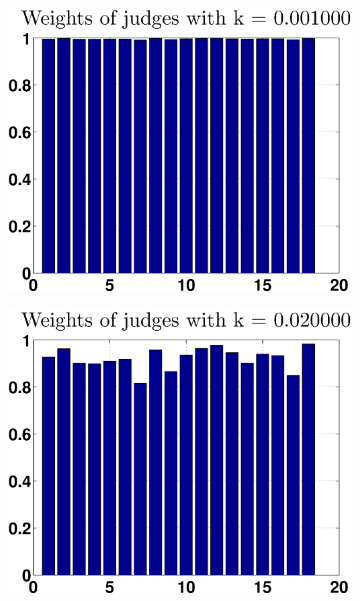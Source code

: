 \documentclass[12pt,a4paper]{article}
\begin{document}
\begin{figure}[h!]
\centering
\begin{subfigure}[b]{0.32\textwidth}
    \centering
    \includegraphics[width = \textwidth]{noPreprocess/weightsk10.eps}
\end{subfigure}
\begin{subfigure}[b]{0.32\textwidth}
    \centering
    \includegraphics[width = \textwidth]{noPreprocess/weightsk200.eps}
\end{subfigure}
\begin{subfigure}[b]{0.32\textwidth}

\end{subfigure}
\end{figure}
\end{document}
